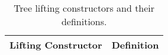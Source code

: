 \begin{table}[H]
\caption{\label{tab:LiftingConsTree}Tree lifting constructors and their definitions.}
\vspace{-10px}
\begin{scriptsize}
\begin{center}
\begin{tabular}{|l|l|}
\hline
\multicolumn{1}{|c|}{\Tstrut \Bstrut\footnotesize Lifting Constructor} & \multicolumn{1}{c|}{\Tstrut \Bstrut \footnotesize Definition} \\
\hline
\hline

\end{tabular}
\end{center}
\end{scriptsize}
\end{table}

